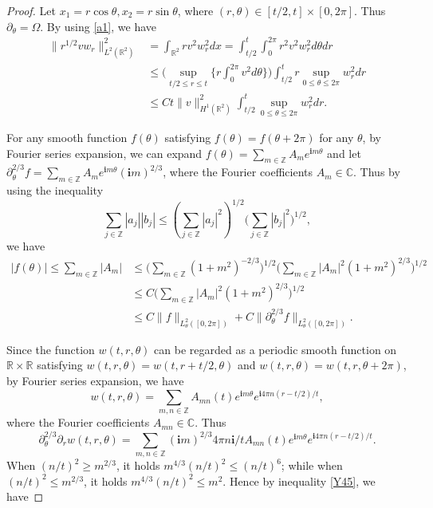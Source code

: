 \documentclass[11pt, reqno]{amsart}
\theoremstyle{definition}
\theoremstyle{remark}
\theoremstyle{definition}
\numberwithin{equation}{section}
\numberwithin{equation}{section}
\def\leq{\leqslant}
\def\geq{\geqslant}
\begin{document}
\begin{proof}
Let $x_1=r\cos\theta,x_2=r\sin\theta$, where
$(r,\theta)\in[t/2,t]\times[0,2\pi]$. Thus
$\partial_{\theta}=\Omega$. By using \eqref{a1}, we have
\begin{align}\label{Y44}
\|r^{1/2}vw_r\|^2_{L^2(\mathbb R^2)}&=\int_{\mathbb
R^2}rv^2w_r^2dx=\int_{t/2}^{t}\int_0^{2\pi}r^2v^2w_r^2d\theta dr
\nonumber\\&\leq \bigg(\sup_{t/2\leq r\leq
t}\Big\{r\int_0^{2\pi}v^2d\theta \Big\}\bigg)
\int_{t/2}^tr\sup_{0\leq \theta\leq2\pi}w_r^2dr \nonumber\\&\leq
Ct\|v\|^2_{H^1(\mathbb R^2)}\int_{t/2}^t\sup_{0\leq
\theta\leq2\pi}w_r^2dr.
\end{align}
\par For any smooth function $f(\theta)$ satisfying $f(\theta)=f(\theta+2\pi)$ for any $\theta$, by Fourier series expansion, we
can expand $f(\theta)=\sum_{m\in\mathbb Z}A_me^{\textbf{i}m\theta}$
and let $
\partial_{\theta}^{2/3}f=\sum_{m\in\mathbb
Z}A_me^{\textbf{i}m\theta}(\textbf{i}m)^{2/3}$, where the Fourier
coefficients $A_m\in\mathbb C$. Thus by using the inequality
\[
\sum_{j\in \mathbb Z}|a_j||b_j|\leq \left(\sum_{j\in \mathbb
Z}|a_j|^2\right)^{1/2}(\sum_{j\in \mathbb Z}|b_j|^2\big)^{1/2},
\] 
we
have
\begin{align}\label{Y45}
|f(\theta)|\leq\sum_{m\in\mathbb Z}|A_m|&\leq\Big(\sum_{m\in\mathbb
Z}(1+m^2)^{-2/3}\Big)^{1/2}\Big(\sum_{m\in\mathbb
Z}|A_m|^2(1+m^2)^{2/3}\Big)^{1/2}\nonumber\\&\leq
C\Big(\sum_{m\in\mathbb Z}|A_m|^2(1+m^2)^{2/3}\Big)^{1/2}
\nonumber\\&\leq C\|f\|_{L_{\theta}^2([0,2\pi])}+
C\|\partial_{\theta}^{2/3}f\|_{L_{\theta}^2([0,2\pi])}.
\end{align}
\par Since the function $w(t,r,\theta)$ can be regarded as a
periodic smooth function on $\mathbb R\times\mathbb R$ satisfying
$w(t,r,\theta)=w(t,r+t/2,\theta)$ and
$w(t,r,\theta)=w(t,r,\theta+2\pi)$, by Fourier series expansion, we
have 
\[
w(t,r,\theta)=\sum_{m,n\in\mathbb
Z}A_{mn}(t)e^{\textbf{i}m\theta}e^{\textbf{i}4\pi n(r-t/2)/t},
\]
where the Fourier coefficients $A_{mn}\in\mathbb C$. Thus
\[
\partial_{\theta}^{2/3}\partial_rw(t,r,\theta)=\sum_{m,n\in\mathbb
Z}(\textbf{i}m)^{2/3}4\pi
n\textbf{i}/tA_{mn}(t)e^{\textbf{i}m\theta}e^{\textbf{i}4\pi
n(r-t/2)/t}.
\]
 When $(n/t)^2\geq m^{2/3}$, it holds
$m^{4/3}(n/t)^2\leq (n/t)^6$; while when $(n/t)^2\leq m^{2/3}$, it holds
$m^{4/3}(n/t)^2\leq m^2$. Hence by inequality \eqref{Y45}, we have

\end{proof}
\end{document}
